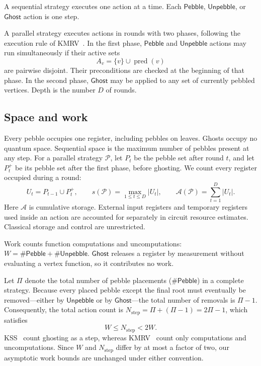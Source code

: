 \documentclass[11pt]{article}
\theoremstyle{definition}
\theoremstyle{remark}
\DeclareMathOperator{\pred}{pred}
\newcommand{\Peb}{\mathsf{Pebble}}
\newcommand{\Unp}{\mathsf{Unpebble}}
\newcommand{\Ghost}{\mathsf{Ghost}}
\newcommand{\Area}{\mathcal A}
\begin{document}
A sequential strategy executes one action at a time. Each $\Peb$, $\Unp$, or $\Ghost$ action is one step.

A parallel strategy executes actions in rounds with two phases, following the execution rule of KMRV~\cite[Section~2.1]{KMRV2026}. In the first phase, $\Peb$ and $\Unp$ actions may run simultaneously if their active sets
\begin{equation}
A_v=\{v\}\cup\pred(v)
\label{eq:active-set}
\end{equation}
are pairwise disjoint. Their preconditions are checked at the beginning of that phase. In the second phase, $\Ghost$ may be applied to any set of currently pebbled vertices. Depth is the number $D$ of rounds.

\subsection{Space and work}
\label{sec:work-counts}

Every pebble occupies one register, including pebbles on leaves. Ghosts occupy no quantum space. Sequential space is the maximum number of pebbles present at any step. For a parallel strategy $\mathcal P$, let $P_t$ be the pebble set after round $t$, and let $P_t^+$ be its pebble set after the first phase, before ghosting. We count every register occupied during a round:
\begin{equation}
U_t=P_{t-1}\cup P_t^+, \qquad s(\mathcal P)=\max_{1\le t\le D}|U_t|, \qquad \Area(\mathcal P)=\sum_{t=1}^D|U_t|.
\label{eq:parallel-resources}
\end{equation}
Here $\Area$ is cumulative storage. External input registers and temporary registers used inside an action are accounted for separately in circuit resource estimates. Classical storage and control are unrestricted.

Work counts function computations and uncomputations: $W = \#\Peb + \#\Unp$. $\Ghost$ releases a register by measurement without evaluating a vertex function, so it contributes no work.

Let $\Pi$ denote the total number of pebble placements ($\#\Peb$) in a complete strategy. Because every placed pebble except the final root must eventually be removed—either by $\Unp$ or by $\Ghost$—the total number of removals is $\Pi - 1$. Consequently, the total action count is $N_{\text{step}} = \Pi + (\Pi - 1) = 2\Pi - 1$, which satisfies
\begin{equation}
    W \le N_{\text{step}} < 2W.
\end{equation}
KSS~\cite{KSS2025} count ghosting as a step, whereas
KMRV~\cite{KMRV2026} count only computations and uncomputations.
Since $W$ and $N_{\mathrm{step}}$ differ by at most a factor of two,
our asymptotic work bounds are unchanged under either convention.
\end{document}
